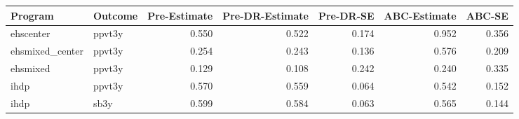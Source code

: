 \begin{table}[ht]
\centering
\begin{tabular}{llrrrrr}
  \hline
Program & Outcome & Pre-Estimate & Pre-DR-Estimate & Pre-DR-SE & ABC-Estimate & ABC-SE \\ 
  \hline
ehscenter & ppvt3y & 0.550 & 0.522 & 0.174 & 0.952 & 0.356 \\ 
  ehsmixed\_center & ppvt3y & 0.254 & 0.243 & 0.136 & 0.576 & 0.209 \\ 
  ehsmixed & ppvt3y & 0.129 & 0.108 & 0.242 & 0.240 & 0.335 \\ 
  ihdp & ppvt3y & 0.570 & 0.559 & 0.064 & 0.542 & 0.152 \\ 
  ihdp & sb3y & 0.599 & 0.584 & 0.063 & 0.565 & 0.144 \\ 
   \hline
\end{tabular}
\end{table}
